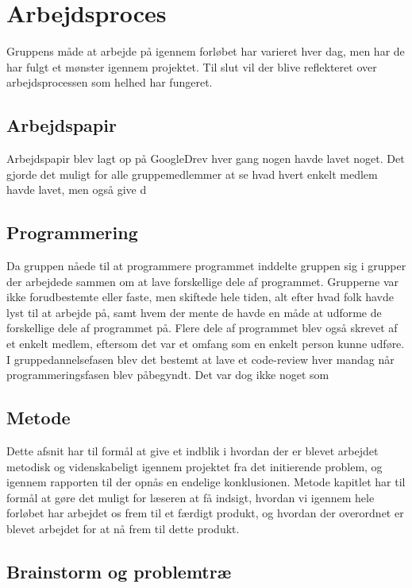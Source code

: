 \chapter{Arbejdsproces}\label{Arbejdsproces}
Gruppens måde at arbejde på igennem forløbet har varieret hver dag, men har de har fulgt et mønster igennem projektet. Til slut vil der blive reflekteret over arbejdsprocessen som helhed har fungeret.


\section{Arbejdspapir}\label{Arbejdspapir}
Arbejdspapir blev lagt op på GoogleDrev hver gang nogen havde lavet noget. Det gjorde det muligt for alle gruppemedlemmer at se hvad hvert enkelt medlem havde lavet, men også give d 

\section{Programmering}\label{Programmering}

Da gruppen nåede til at programmere programmet inddelte gruppen sig i grupper der arbejdede sammen om at lave forskellige dele af programmet. Grupperne var ikke forudbestemte eller faste, men skiftede hele tiden, alt efter hvad folk havde lyst til at arbejde på, samt hvem der mente de havde en måde at udforme de forskellige dele af programmet på. Flere dele af programmet blev også skrevet af et enkelt medlem, eftersom det var et omfang som en enkelt person kunne udføre. I gruppedannelsefasen blev det bestemt at lave et code-review hver mandag når programmeringsfasen blev påbegyndt. Det var dog ikke noget som

\section{Metode}\label{Metode}

Dette afsnit har til formål at give et indblik i hvordan der er blevet arbejdet metodisk og videnskabeligt igennem projektet fra det initierende problem, og igennem rapporten til der opnås en endelige konklusionen. Metode kapitlet har til formål at gøre det muligt for læseren at få indsigt, hvordan vi igennem hele forløbet har arbejdet os frem til et færdigt produkt, og hvordan der overordnet er blevet arbejdet for at nå frem til dette produkt. 

\section{Brainstorm og problemtræ}

